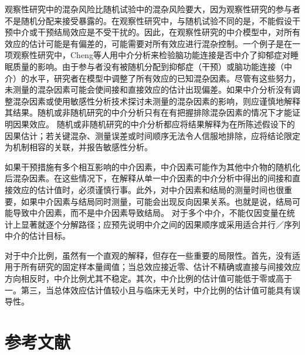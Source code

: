 \documentclass[
  chinese-hans,
  letterpaper,
  DIV=11,
  numbers=noendperiod]{scrreprt}
\begin{document}
观察性研究中的混杂风险比随机试验中的混杂风险要大，因为观察性研究的参与者不是随机分配来接受暴露的。在观察性研究中，与随机试验不同的是，不能假设干预中介或干预结局效应是不受干扰的。因此，在观察性研究的中介模型中，对所有效应的估计可能是有偏差的，可能需要对所有效应进行混杂控制。一个例子是在一项观察性研究中，Cheng等人用中介分析来检验脑功能连接是否中介了抑郁症对睡眠质量的影响。由于参与者没有被随机分配到抑郁症（干预）或脑功能连接（中介）的水平，研究者在模型中调整了所有效应的已知混杂因素。尽管有这些努力，未测量的混杂因素可能会使间接和直接效应的估计出现偏差。如果中介分析没有调整混杂因素或使用敏感性分析技术探讨未测量的混杂因素的影响，则应谨慎地解释其结果。随机或非随机研究的中介分析只有在有把握排除混杂因素的情况下才能证明因果效应。
随机或非随机研究的中介分析都应将结果解释为在所陈述假设下的因果估计；若关键混杂、测量误差或时间顺序无法令人信服地排除，应将结论限定为机制相容的关联，并报告敏感性分析。

如果干预措施有多个相互影响的中介因素，中介因素可能作为其他中介物的随机化后混杂因素。在这些情况下，在解释从单一中介因素的中介分析中得出的间接和直接效应的估计值时，必须谨慎行事。此外，对中介因素和结局的测量时间也很重要，如果中介因素与结局同时测量，可能会出现反向因果关系。也就是说，结局可能导致中介因素，而不是中介因素导致结局。
对于多个中介，不能仅因变量在统计上显著就逐个分解路径；应预先说明中介之间的因果顺序或采用适合并行／序列中介的估计目标。

对于中介比例，虽然有一个直观的解释，但存在一些重要的局限性。首先，没有适用于所有研究的固定样本量阈值；当总效应接近零、估计不精确或直接与间接效应方向相反时，中介比例尤其不稳定。其次，中介比例的估计值可能低于零或高于一。第三，当总体效应估计值较小且与临床无关时，中介比例的估计值可能具有误导性。

\section*{参考文献}\label{ux53c2ux8003ux6587ux732e-9}

\end{document}

